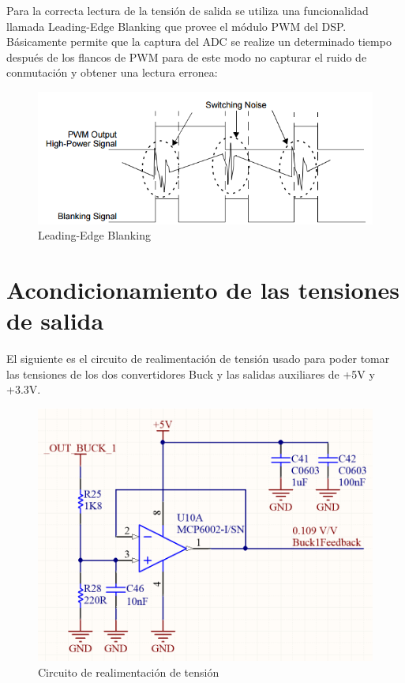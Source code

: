\documentclass[12pt]{report}
\begin{document}
Para la correcta lectura de la tensión de salida se utiliza una funcionalidad llamada Leading-Edge Blanking que provee el módulo PWM del DSP. Básicamente permite que la captura del ADC se realize un determinado tiempo después de los flancos de PWM para de este modo no capturar el ruido de conmutación y obtener una lectura erronea:

\begin{figure}[H]
	\centering
	\includegraphics[width=\textwidth,height=\textheight,keepaspectratio]{leading-edge-blanking}
	\caption{Leading-Edge Blanking}
\end{figure}


\section{Acondicionamiento de las tensiones de salida} \label{acondicionamiento-tensiones}

El siguiente es el circuito de realimentación de tensión usado para poder tomar las tensiones de los dos convertidores Buck y las salidas auxiliares de +5V y +3.3V.

\begin{figure}[H]
	\centering
	\includegraphics[width=\textwidth,height=\textheight,keepaspectratio]{voltage_feedback}
	\caption{Circuito de realimentación de tensión}
	\label{voltage_feedback_circuit}
\end{figure}
\end{document}
